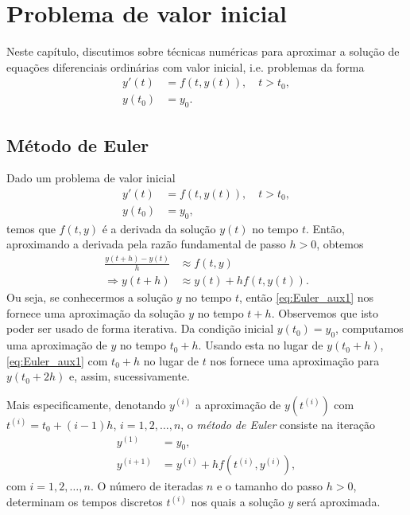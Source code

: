 
\chapter{Problema de valor inicial}\label{cap_pvi}
\thispagestyle{fancy}

Neste capítulo, discutimos sobre técnicas numéricas para aproximar a solução de equações diferenciais ordinárias com valor inicial, i.e. problemas da forma
\begin{align}
  y'(t) &= f(t,y(t)),\quad t>t_0,\\
  y(t_0) &= y_0.
\end{align}

\section{Método de Euler}\label{cap_pvi_sec_Euler}

Dado um problema de valor inicial
\begin{align}
  y'(t) &= f(t,y(t)),\quad t>t_0,\label{eq:Euler_pvi_1}\\
  y(t_0) &= y_0,\label{eq:Euler_pvi_2}
\end{align}
temos que $f(t,y)$ é a derivada da solução $y(t)$ no tempo $t$. Então, aproximando a derivada pela razão fundamental de passo $h>0$, obtemos
\begin{align}
  \frac{y(t+h)-y(t)}{h} &\approx f(t,y) \\
  \Rightarrow y(t+h) &\approx y(t) + hf(t,y(t)).\label{eq:Euler_aux1}
\end{align}
Ou seja, se conhecermos a solução $y$ no tempo $t$, então \eqref{eq:Euler_aux1} nos fornece uma aproximação da solução $y$ no tempo $t+h$. Observemos que isto poder ser usado de forma iterativa. Da condição inicial $y(t_0)=y_0$, computamos uma aproximação de $y$ no tempo $t_0+h$. Usando esta no lugar de $y(t_0+h)$, \eqref{eq:Euler_aux1} com $t_0+h$ no lugar de $t$ nos fornece uma aproximação para $y(t_0+2h)$ e, assim, sucessivamente.

Mais especificamente, denotando $y^{(i)}$ a aproximação de $y(t^{(i)})$ com $t^{(i)}=t_0+(i-1)h$, $i=1, 2, \dotsc, n$, o \emph{método de Euler} consiste na iteração
\begin{align}
  y^{(1)} &= y_0,\label{eq:iter_Euler_1}\\
  y^{(i+1)} &= y^{(i)} + hf(t^{(i)},y^{(i)}),\label{eq:iter_Euler_2}
\end{align}
com $i=1, 2, \dotsc, n$. O número de iteradas $n$ e o tamanho do passo $h>0$, determinam os tempos discretos $t^{(i)}$ nos quais a solução $y$ será aproximada.

